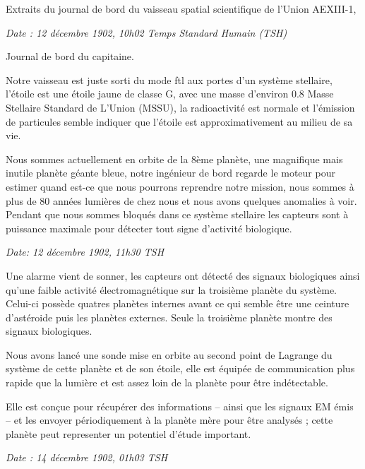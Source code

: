 \documentclass[12pt,hidelinks,a4paper]{book}
\begin{document}
Extraits du journal de bord du vaisseau spatial scientifique de l'Union
AEXIII-1,

\textit{Date : 12 décembre 1902, 10h02 Temps Standard Humain (TSH)}\par
\bigskip

Journal de bord du capitaine.\par
\bigskip
Notre vaisseau est juste sorti du mode \gls{ftl} aux portes d'un
système stellaire, l'étoile est une étoile jaune de classe G, avec
une masse d'environ 0.8 Masse Stellaire Standard de L'Union (MSSU),
la radioactivité est normale et l'émission de particules semble indiquer
que l'étoile est approximativement au milieu de sa vie.

\bigskip
Nous sommes actuellement en orbite de la 8ème planète, une magnifique
mais inutile planète géante bleue, notre ingénieur de bord regarde
le moteur pour estimer quand est-ce que nous pourrons reprendre notre
mission, nous sommes à plus de 80 années lumières de chez nous et
nous avons quelques anomalies à voir. Pendant que nous sommes bloqués
dans ce système stellaire les capteurs sont à puissance maximale pour
détecter tout signe d'activité biologique.\par 
\bigskip

\textit{Date: 12 décembre 1902, 11h30 TSH}\par 
\bigskip

Une alarme vient de sonner, les capteurs ont détecté des signaux biologiques
ainsi qu'une faible activité électromagnétique sur la troisième planète
du système. Celui-ci possède quatres planètes internes avant ce qui
semble être une ceinture d'astéroide puis les planètes externes. Seule
la troisième planète montre des signaux biologiques.\par
\bigskip

Nous avons lancé une sonde mise en orbite au second point de Lagrange
du système de cette planète et de son étoile, elle est équipée de
communication plus rapide que la lumière et est assez loin de la planète
pour être indétectable.\par
\bigskip

Elle est conçue pour récupérer des informations -- ainsi que les
signaux EM émis -- et les envoyer périodiquement à la planète mère
pour être analysés ; cette planète peut representer un potentiel d'étude
important.\par
\bigskip

\textit{Date : 14 décembre 1902, 01h03 TSH}\par
\end{document}
